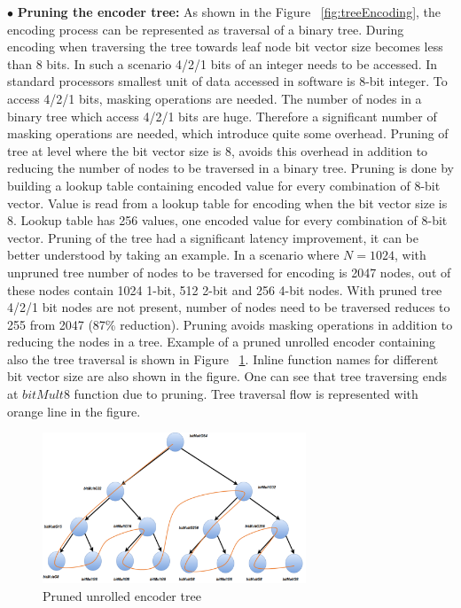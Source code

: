 $\bullet$ \textbf{Pruning the encoder tree:} As shown in the Figure ~\ref{fig:treeEncoding}, the encoding process can be represented as traversal of a binary tree. During encoding when traversing the tree towards leaf node bit vector size becomes less than 8 bits. In such a scenario 4/2/1 bits of an integer needs to be accessed. In standard processors smallest unit of data accessed in software is 8-bit integer. To access 4/2/1 bits, masking operations are needed. The number of nodes in a binary tree which access 4/2/1 bits are huge. Therefore a significant number of masking operations are needed, which introduce quite some overhead. Pruning of tree at level where the bit vector size is 8, avoids this overhead in addition to reducing the number of nodes to be traversed in a binary tree. Pruning is done by building a lookup table containing encoded value for every combination of 8-bit vector. Value is read from a lookup table for encoding when the bit vector size is 8. Lookup table has 256 values, one encoded value for every combination of 8-bit vector.\newline
\newline
Pruning of the tree had a significant latency improvement, it can be better understood by taking an example. In a scenario where $N = 1024$, with unpruned tree number of nodes to be traversed for encoding is 2047 nodes, out of these nodes contain 1024 1-bit, 512 2-bit and 256 4-bit nodes. With pruned tree 4/2/1 bit nodes are not present, number of nodes need to be traversed reduces to 255 from 2047 (87\% reduction). Pruning avoids masking operations in addition to reducing the nodes in a tree. \newline
\newline
Example of a pruned unrolled encoder containing also the tree traversal is shown in Figure ~\ref{fig:unrolledEncoder}. Inline function names for different bit vector size are also shown in the figure. One can see that tree traversing ends at $bitMult8$ function due to pruning. Tree traversal flow is represented with orange line in the figure.

\begin{figure}[!h]
	\centering
	\includegraphics[width=0.7\textwidth]{./figures/unrolledEncoder.pdf}
	\caption{Pruned unrolled encoder tree}
	\label{fig:unrolledEncoder}
\end{figure}


